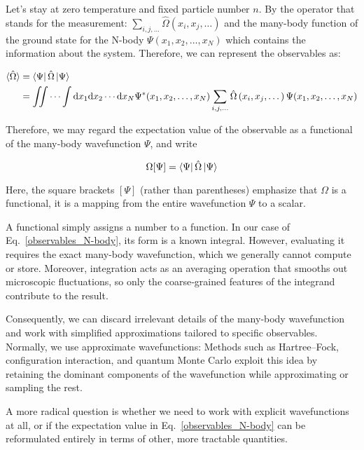 Let's stay at zero temperature and fixed particle number $n$. By the operator that stands for the measurement: $\sum_{i,j,\dots}\hat\Omega\left(x_i,x_j,\dots\right)$ and the many-body function of the ground state for the N-body $\Psi(x_1,x_2,\dots,x_N)$ which contains the information about the system. Therefore, we can represent the observables as:

\begin{equation}
\begin{aligned}
    \braket{\hat\Omega} 
    &= \bra{\Psi}\hat\Omega\ket{\Psi} \\
    &= \iint\cdots\int \mathrm{d}x_1\mathrm{d}x_2\cdots\mathrm{d}x_N\Psi^*(x_1,x_2,\dots,x_N)\sum_{i,j,\dots}\hat\Omega\left(x_i,x_j,\dots\right)\Psi(x_1,x_2,\dots,x_N)
\end{aligned}
\label{observables_N-body}
\end{equation}

Therefore, we may regard the expectation value of the observable as a functional of the many‐body wavefunction $\Psi$, and write

\begin{equation}
\Omega[\Psi] = \bra{\Psi}\hat{\Omega}\ket{\Psi}
\label{observables_functional}
\end{equation}

Here, the square brackets $[\Psi]$ (rather than parentheses) emphasize that $\Omega$ is a functional, it is a mapping from the entire wavefunction $\Psi$ to a scalar.

A functional simply assigns a number to a function. In our case of Eq.~\eqref{observables_N-body}, its form is a known integral. However, evaluating it requires the exact many-body wavefunction, which we generally cannot compute or store. Moreover, integration acts as an averaging operation that smooths out microscopic fluctuations, so only the coarse‐grained features of the integrand contribute to the result.

Consequently, we can discard irrelevant details of the many‐body wavefunction and work with simplified approximations tailored to specific observables. Normally, we use approximate wavefunctions: Methods such as Hartree–Fock, configuration interaction, and quantum Monte Carlo exploit this idea by retaining the dominant components of the wavefunction while approximating or sampling the rest.

A more radical question is whether we need to work with explicit wavefunctions at all, or if the expectation value in Eq.~\eqref{observables_N-body} can be reformulated entirely in terms of other, more tractable quantities.

